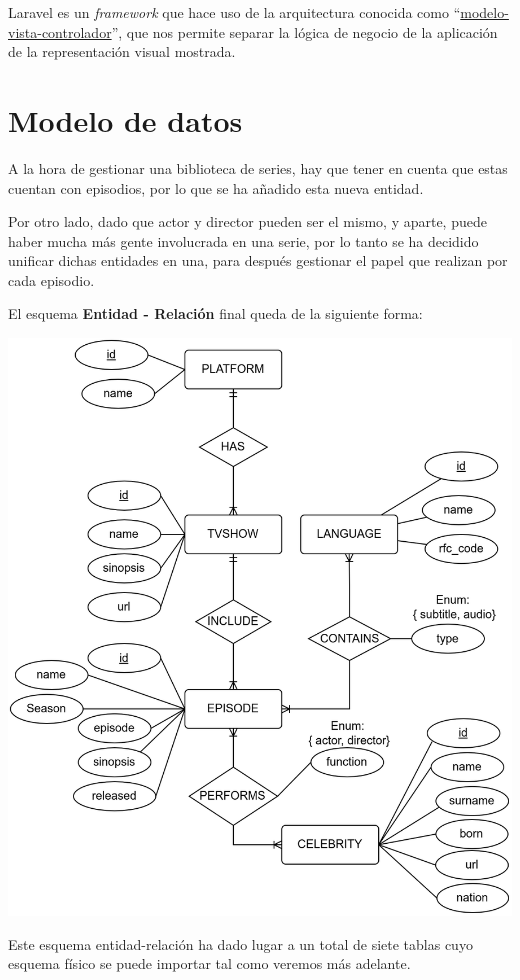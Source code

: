 \documentclass{\ClassPath/viu-tfm-template}
\begin{document}
Laravel es un \textit{framework} que hace uso de la arquitectura conocida como “\href{https://es.wikipedia.org/wiki/Modelo%E2%80%93vista%E2%80%93controlador}{modelo-vista-controlador}”, que nos permite separar la lógica de negocio de la aplicación de la representación visual mostrada.



\chapter{Modelo de datos}
A la hora de gestionar una biblioteca de series, hay que tener en cuenta que estas cuentan con episodios, por lo que se ha añadido esta nueva entidad.

Por otro lado, dado que actor y director pueden ser el mismo, y aparte, puede haber mucha más gente involucrada en una serie, por lo tanto se ha decidido unificar dichas entidades en una, para después gestionar el papel que realizan por cada episodio.

El esquema \textbf{Entidad - Relación} final queda de la siguiente forma:

\begin{center}
    \includegraphics[width=0.8\linewidth]{img/entidad-relacion.png}
\end{center}


Este esquema entidad-relación ha dado lugar a un total de siete tablas cuyo esquema físico se puede importar tal como veremos más adelante.
\end{document}
